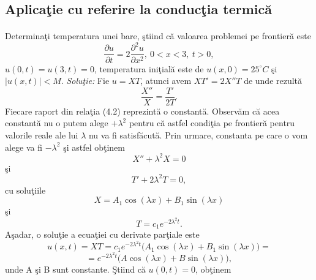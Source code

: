 \documentclass[a4paper,openany,12pt]{report}
\begin{document}
\subsection*{Aplica\c tie cu referire la conduc\c tia termic\u a}
\paragraph*{} Determina\c ti temperatura unei bare, \c stiind c\u a valoarea problemei pe frontier\u a este
\begin{equation*}
\frac{\partial u}{\partial t}=2\frac{\partial^2u}{\partial x^2}, \: 0<x<3,\: t>0,
\end{equation*} 
$u(0,t)=u(3,t)=0$, temperatura ini\c tial\u a este de $u(x,0)=25^\circ C$ \c si $\left|u(x,t)\right|<M$.
\newline
\newline
\textit{Solu\c tie:}
\newline 
Fie $u=XT$, atunci avem $XT'=2X''T$ de unde rezult\u a
\begin{equation}
\frac{X''}{X}=\frac{T'}{2T}. 
\end{equation}
Fiecare raport din rela\c tia (4.2) reprezint\u a o constant\u a. Observ\u am c\u a acea constant\u a nu o putem alege $+\lambda^2$ pentru c\u a astfel condi\c tia pe frontier\u a pentru valorile reale ale lui $\lambda$ nu va fi satisf\u acut\u a. Prin urmare, constanta pe care o vom alege va fi $-\lambda^2$ \c si astfel ob\c tinem
\begin{equation*}
X''+\lambda^2X=0 
\end{equation*}
\c si
\begin{equation*}
T'+2\lambda^2T=0,
\end{equation*}
cu solu\c tiile
\begin{equation*}
X=A_1\cos(\lambda x)+B_1\sin(\lambda x)
\end{equation*}
\c si
\begin{equation*}
T=c_1 e^{-2\lambda^2t}.
\end{equation*}
A\c sadar, o solu\c tie a ecua\c tiei cu derivate par\c tiale este 
\begin{equation*}
u(x,t)=XT=c_1 e^{-2\lambda^2t}\big(A_1\cos(\lambda x)+B_1\sin(\lambda x)\big)=
\end{equation*}
\begin{equation*}
=e^{-2\lambda^2t}\big(A\cos(\lambda x)+B\sin(\lambda x)\big),
\end{equation*}
unde A \c si B sunt constante.
\newline
\c Stiind c\u a $u(0, t)=0$, ob\c tinem
\end{document}

